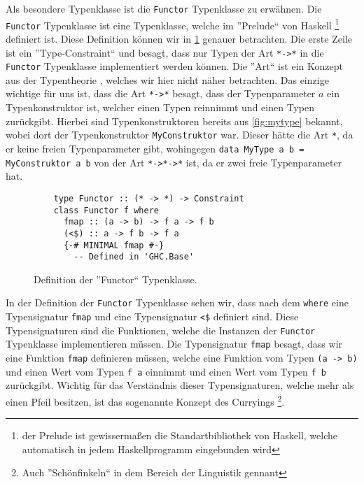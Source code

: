 \documentclass{hhuarticle}
\theoremstyle{definition}
\theoremstyle{theorem}
\begin{document}
  Als besondere Typenklasse ist die \verb|Functor| Typenklasse \cite{functorHaskellWiki} zu
  erwähnen. Die \verb|Functor| Typenklasse ist eine Typenklasse, welche
  im ''Prelude`` von Haskell
  \footnote{der Prelude ist gewissermaßen die Standartbibliothek von
  Haskell, welche automatisch in jedem Haskellprogramm eingebunden wird}
  definiert ist. Diese Definition können wir in
  \cref{fig:functorTypeClass} genauer betrachten.
  Die erste Zeile ist ein ''Type-Constraint`` und besagt, dass
  nur Typen der Art \verb|*->*| in die \verb|Functor| Typenklasse
  implementiert werden können. Die ''Art`` ist ein Konzept
  aus der Typentheorie \cite{kindHaskellWiki}, welches wir hier nicht näher betrachten.
  Das einzige wichtige für uns ist, dass die Art \verb|*->*|
  besagt, dass der Typenparameter $a$ ein Typenkonstruktor ist,
  welcher einen Typen reinnimmt und einen Typen zurückgibt.
  Hierbei sind Typenkonstruktoren bereits aus \cref{fig:mytype} bekannt,
  wobei dort der Typenkonstruktor \verb|MyConstruktor| war. Dieser
  hätte die Art \verb|*|, da er keine freien Typenparameter gibt,
  wohingegen \verb|data MyType a b = MyConstruktor a b| von der
  Art \verb|*->*->*| ist, da er zwei freie Typenparameter hat.

  \begin{figure}[h]
    \begin{verbatim}
    type Functor :: (* -> *) -> Constraint
    class Functor f where
      fmap :: (a -> b) -> f a -> f b
      (<$) :: a -> f b -> f a
      {-# MINIMAL fmap #-}
        -- Defined in 'GHC.Base'
    \end{verbatim}
    \caption{Definition der ''Functor`` Typenklasse.}%
    \label{fig:functorTypeClass}
  \end{figure}

  In der Definition der \verb|Functor| Typenklasse sehen wir, dass
  nach dem \verb|where| eine Typensignatur \verb|fmap| und eine
  Typensignatur \verb|<$| definiert sind. Diese Typensignaturen
  sind die Funktionen, welche die Instanzen der \verb|Functor| Typenklasse
  implementieren müssen.
  Die Typensignatur \verb|fmap| besagt, dass
  wir eine Funktion \verb|fmap| definieren müssen, welche eine Funktion
  vom Typen \verb|(a -> b)| und einen Wert vom Typen \verb|f a| einnimmt
  und einen Wert vom Typen \verb|f b| zurückgibt. Wichtig für das
  Verständnis dieser Typensignaturen, welche mehr als einen Pfeil besitzen,
  ist das sogenannte Konzept des Curryings
  \footnote{Auch ''Schönfinkeln`` in dem Bereich der Linguistik gennant}.
\end{document}
